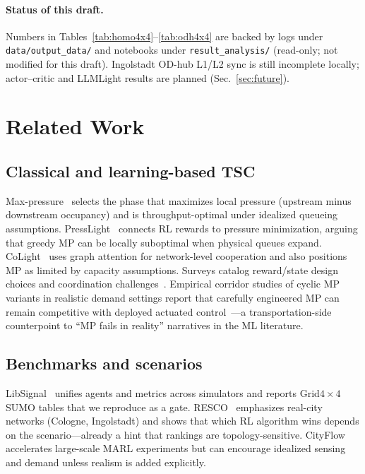 \documentclass[11pt,a4paper]{article}
\begin{document}
\paragraph{Status of this draft.}
Numbers in Tables~\ref{tab:homo4x4}--\ref{tab:odh4x4} are backed by logs under \texttt{data/output\_data/} and notebooks under \texttt{result\_analysis/} (read-only; not modified for this draft).
Ingolstadt OD-hub L1/L2 sync is still incomplete locally; actor--critic and LLMLight results are planned (Sec.~\ref{sec:future}).

\section{Related Work}
\label{sec:related}

\subsection{Classical and learning-based TSC}
Max-pressure~\citep{varaiya2013maxpressure} selects the phase that maximizes local pressure (upstream minus downstream occupancy) and is throughput-optimal under idealized queueing assumptions.
PressLight~\citep{wei2019presslight} connects RL rewards to pressure minimization, arguing that greedy MP can be locally suboptimal when physical queues expand.
CoLight~\citep{wei2019colight} uses graph attention for network-level cooperation and also positions MP as limited by capacity assumptions.
Surveys catalog reward/state design choices and coordination challenges~\citep{wei2019survey,yau2017survey,noaeen2021recent}.
Empirical corridor studies of cyclic MP variants in realistic demand settings report that carefully engineered MP can remain competitive with deployed actuated control~\citep{islam2022mprealistic}---a transportation-side counterpoint to ``MP fails in reality'' narratives in the ML literature.

\subsection{Benchmarks and scenarios}
LibSignal~\citep{mei2023libsignal} unifies agents and metrics across simulators and reports Grid$4{\times}4$ SUMO tables that we reproduce as a gate.
RESCO~\citep{ault2021resco} emphasizes real-city networks (Cologne, Ingolstadt) and shows that which RL algorithm wins depends on the scenario---already a hint that rankings are topology-sensitive.
CityFlow~\citep{zhang2019cityflow} accelerates large-scale MARL experiments but can encourage idealized sensing and demand unless realism is added explicitly.
\end{document}
